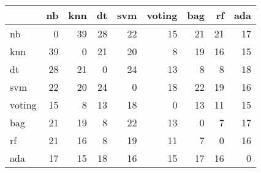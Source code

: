 \begin{tabular}{lrrrrrrrr}
\toprule
{} &  nb &  knn &  dt &  svm &  voting &  bag &  rf &  ada \\
\midrule
nb     &   0 &   39 &  28 &   22 &      15 &   21 &  21 &   17 \\
knn    &  39 &    0 &  21 &   20 &       8 &   19 &  16 &   15 \\
dt     &  28 &   21 &   0 &   24 &      13 &    8 &   8 &   18 \\
svm    &  22 &   20 &  24 &    0 &      18 &   22 &  19 &   16 \\
voting &  15 &    8 &  13 &   18 &       0 &   13 &  11 &   15 \\
bag    &  21 &   19 &   8 &   22 &      13 &    0 &   7 &   17 \\
rf     &  21 &   16 &   8 &   19 &      11 &    7 &   0 &   16 \\
ada    &  17 &   15 &  18 &   16 &      15 &   17 &  16 &    0 \\
\bottomrule
\end{tabular}
